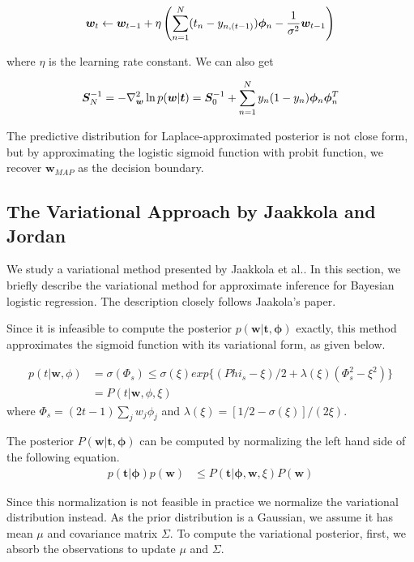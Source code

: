 \begin{equation}
\bm{w}_t \leftarrow \bm{w}_{t-1} + \eta\left( \sum_{n=1}^N (t_n - y_{n,(t-1)}) \bm{\phi}_n -
\frac{1}{\sigma^2}\bm{w}_{t-1} \right)
\end{equation}

where $\eta$ is the learning rate constant. We can also get

\begin{equation}
\bm{S}_N^{-1} = -\nabla^2_{\bm{w}} \ln p(\bm{w}|\bm{t})
= \bm{S}_0^{-1} + \sum_{n=1}^N y_n(1-y_n) \bm{\phi}_n \bm{\phi}_n^T
\end{equation}

The predictive distribution for Laplace-approximated posterior is not close
form, but by approximating the logistic sigmoid function with probit function,
we recover $\bm{w}_{MAP}$ as the decision boundary.

\subsection{The Variational Approach by Jaakkola and Jordan}
We study a variational method presented by Jaakkola et al.\cite{Jaakkola96avariational}. In this section, we briefly describe the variational method for approximate inference for Bayesian logistic regression. The description closely follows Jaakola's paper.

Since it is infeasible to compute the posterior $p(\bm{w} | \bm{t}, \bm{\phi})$ exactly, this method approximates the sigmoid function with its variational form, as given below.

\begin{align}
  p(t | \bm{w}, \phi) &= \sigma(\Phi_s) \leq \sigma(\xi) exp\{(Phi_s - \xi)/2 + \lambda(\xi)(\Phi_s^2 - \xi^2)\} \\
  &= P(t | \bm{w}, \phi, \xi)
\end{align}
where $\Phi_s = (2t - 1)\sum_jw_j\phi_j$ and $\lambda(\xi) = [1/2 - \sigma(\xi)]/(2\xi)$.

The posterior $P(\bm{w}|\bm{t}, \bm{\phi})$ can be computed by normalizing the left hand side of the following equation.
\begin{align}
\label{eq:variational}
p(\bm{t}|\bm{\phi})p(\bm{w}) &\leq P(\bm{t}|\bm{\phi}, \bm{w}, \xi)P(\bm{w})
\end{align}

Since this normalization is not feasible in practice we normalize the variational distribution instead. As the prior distribution is a Gaussian, we assume it has mean $\mu$ and covariance matrix $\Sigma$. To compute the variational posterior, first, we absorb the observations to update $\mu$ and $\Sigma$.

